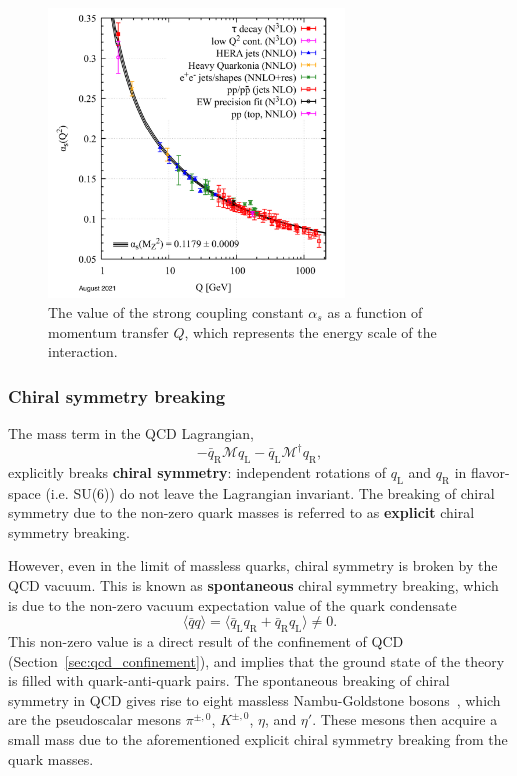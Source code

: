 \begin{figure}
    \centering
    \includegraphics[width=0.7\textwidth]{figures/introduction/running_coupling.png}
    \caption{The value of the strong coupling constant $\alpha_s$ as a function of momentum transfer $Q$, which represents the energy scale of the interaction.}
    \label{fig:asymptotic_freedom}
\end{figure}

\subsubsection{Chiral symmetry breaking}
\label{sec:chiral_symmetry_breaking}

The mass term in the QCD Lagrangian,
\begin{equation}
    -\bar{q}_{\mathrm{R}} \mathcal{M} q_{\mathrm{L}}-\bar{q}_{\mathrm{L}} \mathcal{M}^{\dagger} q_{\mathrm{R}},
\end{equation}
explicitly breaks \textbf{chiral symmetry}: independent rotations of $q_\text{L}$ and $q_\text{R}$ in flavor-space (i.e. SU(6)) do not leave the Lagrangian invariant. The breaking of chiral symmetry due to the non-zero quark masses is referred to as \textbf{explicit} chiral symmetry breaking.

However, even in the limit of massless quarks, chiral symmetry is broken by the QCD vacuum. This is known as \textbf{spontaneous} chiral symmetry breaking, which is due to the non-zero vacuum expectation value of the quark condensate~\cite{QuarkCondensate}
%
\begin{equation}
    \label{eq:quark_condensate}
    \langle \bar{q}q \rangle = \langle \bar{q}_\text{L}q_\text{R} + \bar{q}_\text{R}q_\text{L} \rangle \neq 0.
\end{equation}
%
This non-zero value is a direct result of the confinement of QCD~\cite{TongGaugeTheory} (Section~\ref{sec:qcd_confinement}), and implies that the ground state of the theory is filled with quark-anti-quark pairs. The spontaneous breaking of chiral symmetry in QCD gives rise to eight massless Nambu-Goldstone bosons~\cite{NambuGoldstone}, which are the pseudoscalar mesons $\pi^{\pm, 0}$, $K^{\pm, 0}$, $\eta$, and $\eta'$. These mesons then acquire a small mass due to the aforementioned explicit chiral symmetry breaking from the quark masses. 

